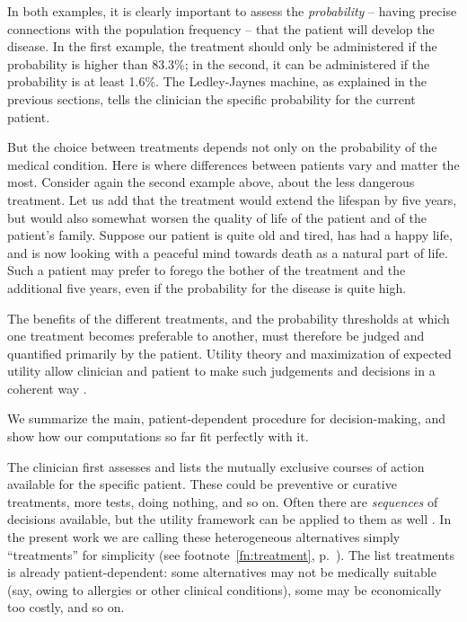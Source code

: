 \documentclass[utf8]{FrontiersinHarvard} %
\renewcommand*{\|}[1][]{\nonscript\:#1\vert\nonscript\:\mathopen{}}
\newcommand*{\ljm}{Ledley-Jaynes machine}
\begin{document}
In both examples, it is clearly important to assess the \emph{probability} -- having precise connections with the population frequency -- that the patient will develop the disease. In the first example, the treatment should only be administered if the probability is higher than 83.3\%; in the second, it can be administered if the probability is at least 1.6\%. The \ljm, as explained in the previous sections, tells the clinician the specific probability for the current patient.

But the choice between treatments depends not only on the probability of the medical condition. Here is where differences between patients vary and matter the most. Consider again the second example above, about the less dangerous treatment. Let us add that the treatment would extend the lifespan by five years, but would also somewhat worsen the quality of life of the patient and of the patient's family. Suppose our patient is quite old and tired, has had a happy life, and is now looking with a peaceful mind towards death as a natural part of life. Such a patient may prefer to forego the bother of the treatment and the additional five years, even if the probability for the disease is quite high.

The benefits of the different treatments, and the probability thresholds at which one treatment becomes preferable to another, must therefore be judged and quantified primarily by the patient. Utility theory and maximization of expected utility allow clinician and patient to make such judgements and decisions in a coherent way \citetext{\citealt{soxetal1988_r2013,huninketal2001_r2014}; see also the clear and charming exposition by \citealt{lindley1971_r1988}, and \citealt{ohaganetal2006}}.

We summarize the main, patient-dependent procedure for decision-making, and show how our computations so far fit perfectly with it.

The clinician first assesses and lists the mutually exclusive courses of action available for the specific patient. These could be preventive or curative treatments, more tests, doing nothing, and so on. Often there are \emph{sequences} of decisions available, but the utility framework can be applied to them as well \citep[see references above and][]{raiffa1968_r1970}. In the present work we are calling these heterogeneous alternatives simply \enquote{treatments} for simplicity (see footnote~\ref{fn:treatment}, p.~\pageref{fn:treatment}). The list treatments is already patient-dependent: some alternatives may not be medically suitable (say, owing to allergies or other clinical conditions), some may be economically too costly, and so on.
\end{document}
